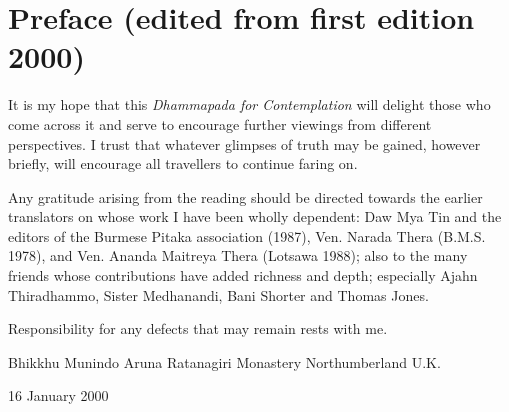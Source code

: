 
\chapter{Preface (edited from first edition 2000)}

It is my hope that this \emph{Dhammapada for Contemplation }will delight those who come across it and serve to encourage further viewings from different perspectives. I trust that whatever glimpses of truth may be gained, however briefly, will encourage all travellers to continue faring on. 

Any gratitude arising from the reading should be directed towards the earlier translators on whose work I have been wholly dependent: Daw Mya Tin and  the editors of the  Burmese Pitaka association (1987), Ven. Narada Thera (B.M.S. 1978), and Ven. Ananda Maitreya Thera  (Lotsawa 1988); also to the many friends whose contributions have added richness and depth; especially Ajahn Thiradhammo, Sister Medhanandi, Bani Shorter and Thomas Jones.

Responsibility for any defects that may remain rests with me.

Bhikkhu Munindo
Aruna Ratanagiri Monastery
Northumberland
U.K.

16 January 2000

